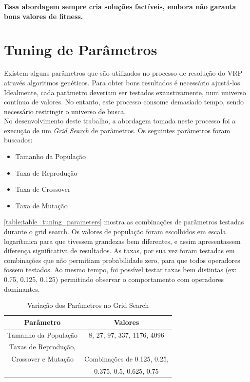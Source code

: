 \documentclass[conference]{IEEEtran}
\begin{document}
\textbf{Essa abordagem sempre cria soluções factíveis, embora não garanta bons valores de fitness.}


\section{Tuning de Parâmetros}
Existem alguns parâmetros que são utilizados no processo de resolução do VRP através algoritmos genéticos. Para obter bons resultados é necessário ajustá-los. Idealmente, cada parâmetro deveriam ser testados exaustivamente, num universo contínuo de valores. No entanto, este processo consome demasiado tempo, sendo necessário restringir o universo de busca.\\
No desenvolvimento deste trabalho, a abordagem tomada neste processo foi a execução de um \textit{Grid Search} de parâmetros. Os seguintes parâmetros foram buscados:
\begin{itemize}
\item Tamanho da População
\item Taxa de Reprodução
\item Taxa de Crossover
\item Taxa de Mutação
\end{itemize}

\ref{table:table_tuning_parameters} mostra as combinações de parâmetros testadas durante o grid search. Os valores de população foram escolhidos em escala logarítmica para que tivessem grandezas bem diferentes, e assim apresentassem diferença significativa de resultados. As taxas, por sua vez foram testadas em combinações que não permitiam probabilidade zero, para que todos operadores fossem testados. Ao mesmo tempo, foi possível testar taxas bem distintas (ex: 0.75, 0.125, 0.125) permitindo observar o comportamento com operadores dominantes.

\begin{table}[!t]
\renewcommand{\arraystretch}{1.3}
\centering
\caption{Variação dos Parâmetros no Grid Search}
\label{table_tuning_parameters}
\begin{tabular}{|c||c|}
\hline
Parâmetro & Valores\\
\hline
Tamanho da População & 8, 27, 97, 337, 1176, 4096\\
\hline
Taxas de Reprodução, \\Crossover e Mutação & Combinações de 0.125, 0.25, \\ & 0.375, 0.5, 0.625, 0.75\\
\hline
\end{tabular}
\end{table}
\end{document}
